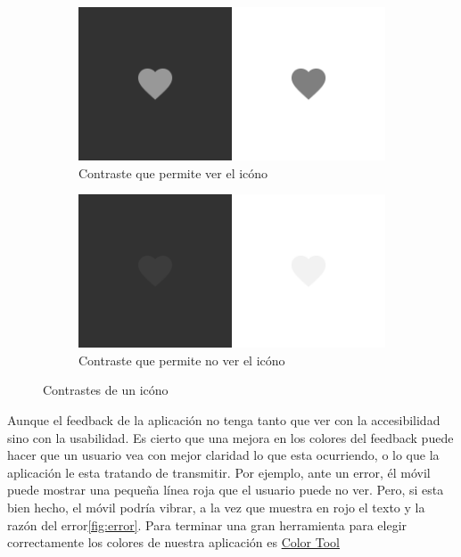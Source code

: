 \begin{figure}[hbt]
	\centering
	\begin{subfigure}[b]{0.4\linewidth}
		\centering
        \includegraphics[width=1\linewidth]{figs/Desarrollo/Accesibilidad/corazonesbien}
        \caption[Contraste que permite ver el icóno]{Contraste que permite ver el icóno}
	\end{subfigure} 
	\begin{subfigure}[b]{0.4\linewidth}
		\centering
        \includegraphics[width=1\linewidth]{figs/Desarrollo/Accesibilidad/corazonesmal}
        \caption[Contraste que no permite ver el icóno]{Contraste que permite no ver el icóno}
	\end{subfigure} 
	\caption[Contrastes de un icóno]{Contrastes de un icóno}
	\label{fig:corazones}
\end{figure}

Aunque el feedback de la aplicación no tenga tanto que ver con la accesibilidad sino con la usabilidad. Es cierto que una mejora en los colores del feedback puede hacer que un usuario vea con mejor claridad lo que esta ocurriendo, o lo que la aplicación le esta tratando de transmitir. Por ejemplo, ante un error, él móvil puede mostrar una pequeña línea roja que el usuario puede no ver. Pero, si esta bien hecho, el móvil podría vibrar, a la vez que muestra en rojo el texto y la razón del error\ref{fig:error}. Para terminar una gran herramienta para elegir correctamente los colores de nuestra aplicación es \href{https://material.io/resources/color/#!/?view.left=1&view.right=0}{Color Tool} \\

